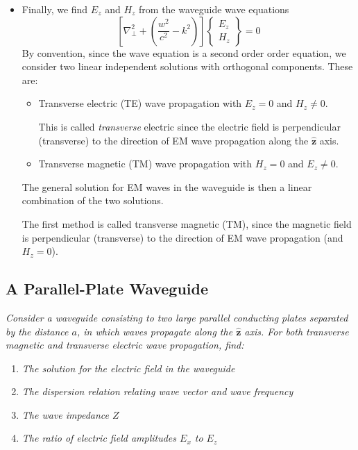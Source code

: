 \documentclass[11pt, a4paper]{article}
\renewcommand{\vec}[1]{\bm{#1}} %
\newcommand{\uvec}[1]{\hat{\vec{#1}}} %
\renewcommand{\laplacian}{\nabla^{2}}
\begin{document}
\begin{itemize}
	\item Finally, we find $ E_{z} $ and $ H_{z} $ from the waveguide wave equations
	\begin{equation*}
		\left[\laplacian_{\perp} + \left(\frac{w^{2}}{c^{2}} - k^{2}\right)\right]
		\begin{Bmatrix}
		E_{z}\\
		H_{z}
		\end{Bmatrix}
		= 0
	\end{equation*}
	By convention, since the wave equation is a second order order equation, we consider two linear independent solutions with orthogonal components. These are:
	\begin{itemize}
		\item Transverse electric (TE) wave propagation with $ E_{z} = 0 $ and $ H_{z} \neq 0 $. 
		
		This is called \textit{transverse} electric since the electric field is perpendicular (transverse) to the direction of EM wave propagation along the $ \uvec{z} $ axis.
		
		\item Transverse magnetic (TM) wave propagation with $ H_{z} = 0 $ and $ E_{z} \neq 0 $.
	\end{itemize}
	The general solution for EM waves in the waveguide is then a linear combination of the two solutions.
	
	
	
	The first method is called transverse magnetic (TM), since the magnetic field is perpendicular (transverse) to the direction of EM wave propagation (and $ H_{z} = 0 $). 
	
	
\end{itemize}

\subsection{A Parallel-Plate Waveguide}
\textit{Consider a waveguide consisting to two large parallel conducting plates separated by the distance $ a $, in which waves propagate along the $ \uvec{z} $ axis. For both transverse magnetic and transverse electric wave propagation, find:}
\begin{enumerate}
	\item \textit{The solution for the electric field in the waveguide}
	\item \textit{The dispersion relation relating wave vector and wave frequency}
	\item \textit{The wave impedance $ Z $}
	\item \textit{The ratio of electric field amplitudes $ E_{x} $ to $ E_{z} $}
\end{enumerate}
\end{document}
